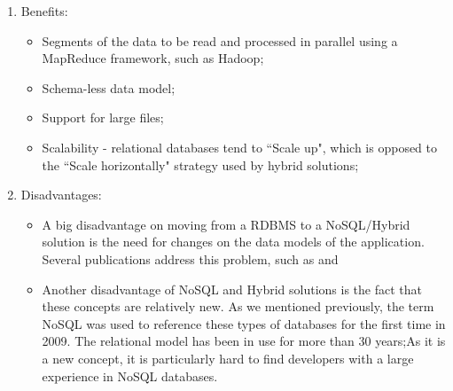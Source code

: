 \documentclass[]{tEIS2e}
\theoremstyle{plain}
\theoremstyle{remark}
\begin{document}
\begin{enumerate}
    \item Benefits: 
\begin{itemize}
  \item Segments of the data to be read and processed in parallel using a MapReduce framework, such as Hadoop;
  \item Schema-less data model;
  \item Support for large files;
  \item Scalability - relational databases tend to ``Scale up", which is opposed to the ``Scale horizontally" strategy used by hybrid solutions;
\end{itemize}

    \item Disadvantages:
    \begin{itemize}
    \item A big disadvantage on moving from a RDBMS to a NoSQL/Hybrid solution is the need for changes on the data models of the application. Several publications address this problem, such as \citep{Schram:2012:MND:2384716.2384773} \citep{Cattell:2011:SSN:1978915.1978919} and \citep{Mohan:2013:HRI:2452376.2452378}
    \item Another disadvantage of NoSQL and Hybrid solutions is the fact that these concepts are relatively new. As we mentioned previously, the term NoSQL was used to reference these types of databases for the first time in 2009\citep{ericevans}. The relational model has been in use for more than 30 years;As it is a new concept, it is particularly hard to find developers with a large experience in NoSQL databases.
\end{itemize}
    

\end{enumerate}
\end{document}
